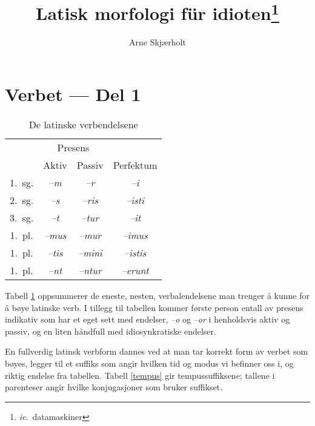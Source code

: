 \documentclass[a4paper]{article}
\title{Latisk morfologi f\"ur idioten\footnote{\emph{ie}.~datamaskiner}}
\author{Arne Skj\ae{}rholt}
\begin{document}
\maketitle

\section{Verbet --- Del 1}

\begin{table}[hp]
\begin{center}
\begin{tabular}{|c|c|c|c|}
    \hline
       & \multicolumn{2}{c|}{Presens} & \\ \cline{2-3}
       & Aktiv & Passiv & Perfektum \\
    \hline
1.~sg. & \emph{--m}   & \emph{--r}    & \emph{--i}       \\
2.~sg. & \emph{--s}   & \emph{--ris}  & \emph{--isti}    \\
3.~sg. & \emph{--t}   & \emph{--tur}  & \emph{--it}      \\
1.~pl. & \emph{--mus} & \emph{--mur}  & \emph{--imus}    \\
1.~pl. & \emph{--tis} & \emph{--mini} & \emph{--istis}   \\
1.~pl. & \emph{--nt}  & \emph{--ntur} & \emph{--erunt}   \\
    \hline
\end{tabular}
\caption{De latinske verbendelsene}
\label{endelser}
\end{center}
\end{table}

Tabell \ref{endelser} oppsummerer de eneste, nesten, verbalendelsene man
trenger \aa{} kunne for \aa{} b\o{}ye latinske verb. I tillegg til tabellen
kommer f\o{}rste person entall av presens indikativ som har et eget sett med
endelser, \emph{--o} og \emph{--or} i henholdsvis aktiv og passiv, og en liten
h\aa{}ndfull med idiosynkratiske endelser.

En fullverdig latinsk verbform dannes ved at man tar korrekt form av verbet
som b\o{}yes, legger til et suffiks som angir hvilken tid og modus vi befinner
oss i, og riktig endelse fra tabellen. Tabell \ref{tempus} gir
tempussuffiksene; tallene i parenteser angir hvilke konjugasjoner som bruker
suffikset.
\end{document}

